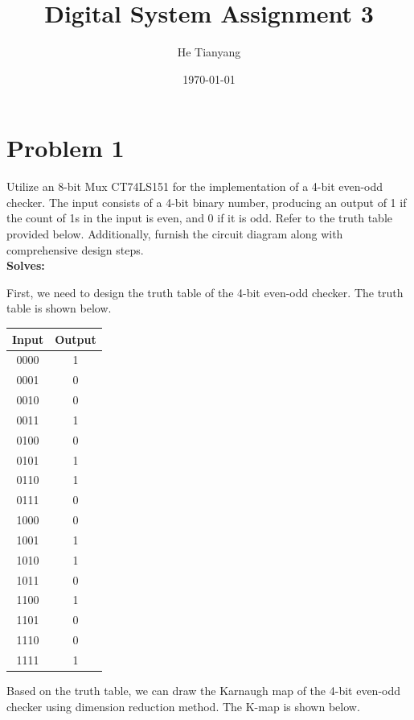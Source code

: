 \documentclass{article}
\title{Digital System Assignment 3}
\author{He Tianyang}
\date{\today}
\begin{document}
\maketitle

\section{Problem 1}
Utilize an 8-bit Mux CT74LS151 for the implementation of a 4-bit even-odd checker. The input consists of a 4-bit binary number, producing an output of 1 if the count of 1s in the input is even, and 0 if it is odd. Refer to the truth table provided below. Additionally, furnish the circuit diagram along with comprehensive design steps.
\\
\textbf{Solves:}

First, we need to design the truth table of the 4-bit even-odd checker. The truth table is shown below.

\begin{table}[H]
    \centering
    \begin{tabular}{|c|c|}
        \hline
        Input & Output \\
        \hline
        0000  & 1      \\
        0001  & 0      \\
        0010  & 0      \\
        0011  & 1      \\
        0100  & 0      \\
        0101  & 1      \\
        0110  & 1      \\
        0111  & 0      \\
        1000  & 0      \\
        1001  & 1      \\
        1010  & 1      \\
        1011  & 0      \\
        1100  & 1      \\
        1101  & 0      \\
        1110  & 0      \\
        1111  & 1      \\
        \hline
    \end{tabular}
\end{table}

Based on the truth table, we can draw the Karnaugh map of the 4-bit even-odd checker using dimension reduction method. The K-map is shown below.
\end{document}
